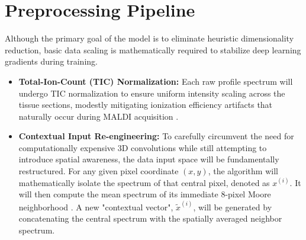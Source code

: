 \documentclass[
12pt, %
oneside, %
english, %
onehalfspacing, %
nolistspacing, %
headsepline, %
]{MastersDoctoralThesis} %
\begin{document}

\section{Preprocessing Pipeline}
Although the primary goal of the model is to eliminate heuristic dimensionality reduction, basic data scaling is mathematically required to stabilize deep learning gradients during training.
\begin{itemize}
    \item \textbf{Total-Ion-Count (TIC) Normalization:} Each raw profile spectrum will undergo TIC normalization to ensure uniform intensity scaling across the tissue sections, modestly mitigating ionization efficiency artifacts that naturally occur during MALDI acquisition \citep{deininger2011normalization}.
    \item \textbf{Contextual Input Re-engineering:} To carefully circumvent the need for computationally expensive 3D convolutions while still attempting to introduce spatial awareness, the data input space will be fundamentally restructured. For any given pixel coordinate $(x, y)$, the algorithm will mathematically isolate the spectrum of that central pixel, denoted as $x^{(i)}$. It will then compute the mean spectrum of its immediate 8-pixel Moore neighborhood \citep{winderbaum2015feature}. A new "contextual vector", $\tilde{x}^{(i)}$, will be generated by concatenating the central spectrum with the spatially averaged neighbor spectrum.
    \begin{figure}[H]
        \centering
\end{figure}
\end{itemize}
\end{document}
